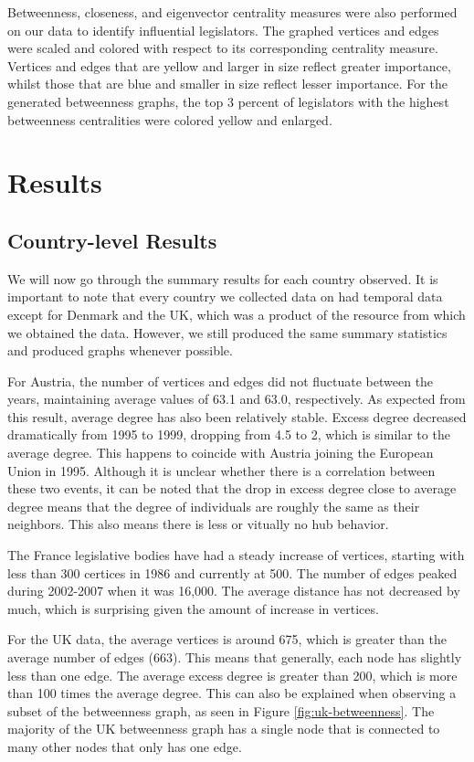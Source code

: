 \documentclass[12pt]{article}
\begin{document}
\begin{multicols*}{2}
Betweenness, closeness, and eigenvector centrality measures were also performed on our data to identify influential legislators. The graphed vertices and edges were scaled and colored with respect to its corresponding centrality measure. Vertices and edges that are yellow and larger in size reflect greater importance, whilst those that are blue and smaller in size reflect lesser importance. For the generated betweenness graphs, the top 3 percent of legislators with the highest betweenness centralities were colored yellow and enlarged.


\section{Results}
\subsection{Country-level Results}
We will now go through the summary results for each country observed. It is important to note that every country we collected data on had temporal data except for Denmark and the UK, which was a product of the resource from which we obtained the data. However, we still produced the same summary statistics and produced graphs whenever possible.

For Austria, the number of vertices and edges did not fluctuate between the years, maintaining average values of 63.1 and 63.0, respectively. As expected from this result, average degree has also been relatively stable. Excess degree decreased dramatically from 1995 to 1999, dropping from 4.5 to 2, which is similar to the average degree. This happens to coincide with Austria joining the European Union in 1995. Although it is unclear whether there is a correlation between these two events, it can be noted that the drop in excess degree close to average degree means that the degree of individuals are roughly the same as their neighbors. This also means there is less or vitually no hub behavior.

The France legislative bodies have had a steady increase of vertices, starting with less than 300 certices in 1986 and currently at 500. The number of edges peaked during 2002-2007 when it was 16,000. The average distance has not decreased by much, which is surprising given the amount of increase in vertices.

For the UK data, the average vertices is around 675, which is greater than the average number of edges (663). This means that generally, each node has slightly less than one edge. The average excess degree is greater than 200, which is more than 100 times the average degree. This can also be explained when observing a subset of the betweenness graph, as seen in Figure \ref{fig:uk-betweenness}. The majority of the UK betweenness graph has a single node that is connected to many other nodes that only has one edge. 


\end{multicols*}
\end{document}
